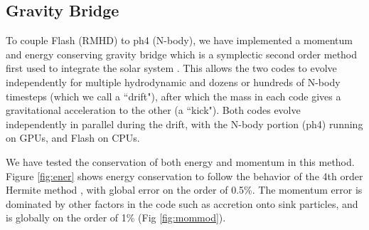 \documentclass[11pt]{article}
\begin{document}




\subsection{Gravity Bridge}

To couple Flash (RMHD) to ph4 (N-body), we have implemented a momentum and energy conserving gravity bridge \citep{Fujii_Makino_bridge} which is a symplectic second order method first used to integrate the solar system \citep{Wisdom_Holman_1991}. This allows the two codes to evolve independently for multiple hydrodynamic and dozens or hundreds of N-body timesteps (which we call a ``drift"), after which the mass in each code gives a gravitational acceleration to the other (a ``kick"). Both codes evolve independently in parallel during the drift, with the N-body portion (ph4) running on GPUs, and Flash on CPUs.

We have tested the conservation of both energy and momentum in this method. Figure \ref{fig:ener} shows energy conservation to follow the behavior of the 4th order Hermite method \citep{binney2011galactic}, with global error on the order of 0.5\%. The momentum error is dominated by other factors in the code such as accretion onto sink particles, and is globally on the order of 1\% (Fig \ref{fig:mommod}).
\end{document}
